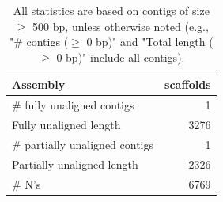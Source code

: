 \documentclass[12pt,a4paper]{article}
\begin{document}
\begin{table}[ht]
\begin{center}
\caption{All statistics are based on contigs of size $\geq$ 500 bp, unless otherwise noted (e.g., "\# contigs ($\geq$ 0 bp)" and "Total length ($\geq$ 0 bp)" include all contigs).}
\begin{tabular}{|l*{1}{|r}|}
\hline
Assembly & scaffolds \\ \hline
\# fully unaligned contigs & 1 \\ \hline
Fully unaligned length & 3276 \\ \hline
\# partially unaligned contigs & 1 \\ \hline
Partially unaligned length & 2326 \\ \hline
\# N's & 6769 \\ \hline
\end{tabular}
\end{center}
\end{table}
\end{document}
